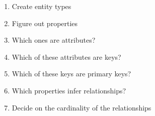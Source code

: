 \begin{enumerate}
    \item Create entity types
    \item Figure out properties
    \item Which ones are attributes?
    \item Which of these attributes are keys?
    \item Which of these keys are primary keys?
    \item Which properties infer relationships?
    \item Decide on the cardinality of the relationships
\end{enumerate}
